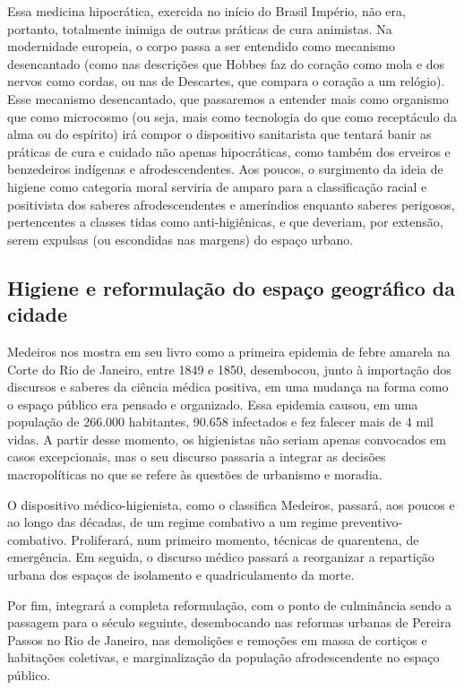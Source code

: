 \documentclass[12pt]{extarticle}
\begin{document}
Essa medicina hipocrática, exercida no início do Brasil Império, não
era, portanto, totalmente inimiga de outras práticas de cura animistas.
Na modernidade europeia, o corpo passa a ser entendido como mecanismo
desencantado (como nas descrições que Hobbes faz do coração como mola e
dos nervos como cordas, ou nas de Descartes, que compara o coração a um
relógio). Esse mecanismo desencantado, que passaremos a entender mais
como organismo que como microcosmo (ou seja, mais como tecnologia do que
como receptáculo da alma ou do espírito) irá compor o dispositivo
sanitarista que tentará banir as práticas de cura e cuidado não apenas
hipocráticas, como também dos erveiros e benzedeiros indígenas e
afrodescendentes. Aos poucos, o surgimento da ideia de higiene como
categoria moral serviria de amparo para a classificação racial e
positivista dos saberes afrodescendentes e ameríndios enquanto saberes
perigosos, pertencentes a classes tidas como anti-higiênicas, e que
deveriam, por extensão, serem expulsas (ou escondidas nas margens) do
espaço urbano.

\subsection{Higiene e reformulação do espaço geográfico da cidade}

Medeiros nos mostra em seu livro como a primeira epidemia de febre
amarela na Corte do Rio de Janeiro, entre 1849 e 1850, desembocou, junto
à importação dos discursos e saberes da ciência médica positiva, em uma
mudança na forma como o espaço público era pensado e organizado. Essa
epidemia causou, em uma população de 266.000 habitantes, 90.658
infectados e fez falecer mais de 4 mil vidas. A partir desse momento, os
higienistas não seriam apenas convocados em casos excepcionais, mas o
seu discurso passaria a integrar as decisões macropolíticas no que se
refere às questões de urbanismo e moradia.

O dispositivo médico-higienista, como o classifica Medeiros, passará,
aos poucos e ao longo das décadas, de um regime combativo a um regime
preventivo-combativo. Proliferará, num primeiro momento, técnicas de
quarentena, de emergência. Em seguida, o discurso médico passará a
reorganizar a repartição urbana dos espaços de isolamento e
quadriculamento da morte.

Por fim, integrará a completa reformulação, com o ponto de culminância
sendo a passagem para o século seguinte, desembocando nas reformas
urbanas de Pereira Passos no Rio de Janeiro, nas demolições e remoções
em massa de cortiços e habitações coletivas, e marginalização da
população afrodescendente no espaço público.
\end{document}
